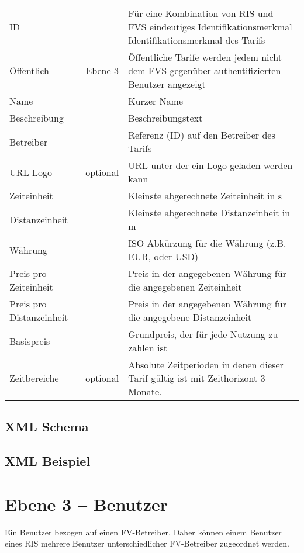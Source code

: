 \begin{flushleft}
\begin{tabularx}{\linewidth}{l>{\raggedright\arraybackslash}l>{\raggedright\arraybackslash}X} 
\toprule
ID & & Für eine Kombination von RIS und FVS eindeutiges Identifikationsmerkmal Identifikationsmerkmal des Tarifs \\
Öffentlich & Ebene 3 & Öffentliche Tarife werden jedem nicht dem FVS gegenüber authentifizierten Benutzer angezeigt \\
Name & & Kurzer Name \\
Beschreibung & & Beschreibungstext \\
Betreiber & & Referenz (ID) auf den Betreiber des Tarifs \\
URL Logo & optional & URL unter der ein Logo geladen werden kann \\
Zeiteinheit & & Kleinste abgerechnete Zeiteinheit in s \\
Distanzeinheit & & Kleinste abgerechnete Distanzeinheit in m \\
Währung & & ISO Abkürzung für die Währung (z.B. EUR, oder USD) \\
Preis pro Zeiteinheit & & Preis in der angegebenen Währung für die angegebenen Zeiteinheit \\
Preis pro Distanzeinheit & & Preis in der angegebenen Währung für die angegebene Distanzeinheit \\
Basispreis & & Grundpreis, der für jede Nutzung zu zahlen ist \\
Zeitbereiche & optional & Absolute Zeitperioden in denen dieser Tarif gültig ist mit Zeithorizont 3 Monate. \\
\bottomrule
\end{tabularx}
\end{flushleft}

\subsection{XML Schema}


\subsection{XML Beispiel}

\section{Ebene 3 -- Benutzer}
Ein Benutzer bezogen auf einen FV-Betreiber. Daher können einem Benutzer eines RIS mehrere Benutzer unterschiedlicher FV-Betreiber zugeordnet werden.

